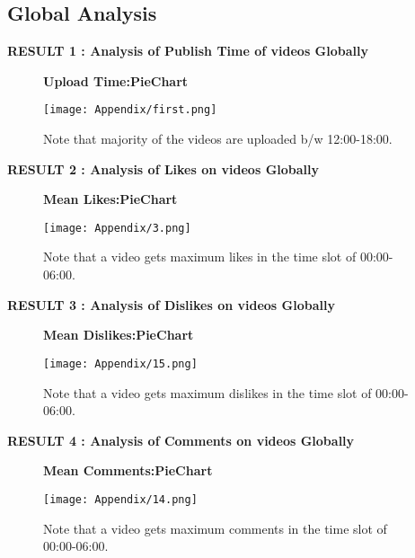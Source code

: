 \documentclass[runningheads]{llncs}
\begin{document}
\subsection{Global Analysis}
\textbf{RESULT 1 : Analysis of Publish Time of videos Globally }
\begin{figure}[H]
\centering
\begin{minipage}{.5\textwidth}
  \centering
  \textbf{Upload Time:PieChart}\par\medskip
  \texttt{[image: Appendix/first.png]}
  \caption{Note that majority of the videos are uploaded b/w 12:00-18:00.}
\end{minipage}
\end{figure}
\textbf{RESULT 2 : Analysis of Likes on videos Globally}
\begin{figure}[H]
\centering
\begin{minipage}{.5\textwidth}
  \centering
  \textbf{Mean Likes:PieChart}\par\medskip
  \texttt{[image: Appendix/3.png]}
  \caption{Note that a video gets maximum likes in the time slot of 00:00-06:00.}
\end{minipage}
\end{figure}
\textbf{RESULT 3 : Analysis of Dislikes on videos Globally}
\begin{figure}[H]
\centering
\begin{minipage}{.5\textwidth}
  \centering
  \textbf{Mean Dislikes:PieChart}\par\medskip
  \texttt{[image: Appendix/15.png]}
  \caption{Note that a video gets maximum dislikes in the time slot of 00:00-06:00.}
\end{minipage}
\end{figure}
\textbf{RESULT 4 : Analysis of Comments on videos Globally}
\begin{figure}[H]
\centering
\begin{minipage}{.5\textwidth}
  \centering
  \textbf{Mean Comments:PieChart}\par\medskip
  \texttt{[image: Appendix/14.png]}
  \caption{Note that a video gets maximum comments in the time slot of 00:00-06:00.}
\end{minipage}
\end{figure}
\end{document}
